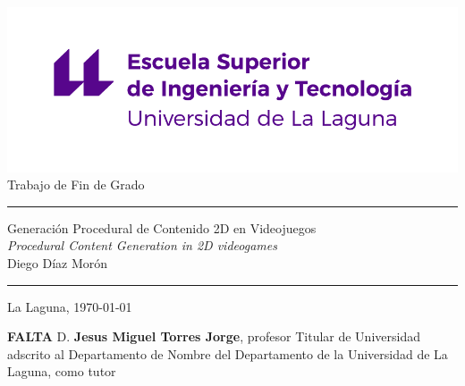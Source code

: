 \documentclass[spanish,a4paper,12pt,oneside]{extreport}
\begin{document}
\renewcommand\listtablename{Índice de Tablas}    
\renewcommand\listfigurename{Índice de Figuras}    

\pagestyle{empty}
\thispagestyle{empty}


\newcommand{\HRule}{\rule{\linewidth}{1mm}}
\setlength{\parindent}{0mm}
\setlength{\parskip}{0mm}


\begin{center}
\includegraphics[scale=0.8]{images/escuela-ingenieria-tecnologia-original}\\[10mm]
{\Huge Trabajo de Fin de Grado}
\end{center}

\HRule
\begin{flushright}
        {\Huge Generación Procedural de Contenido 2D en Videojuegos} \\[2.5mm]
        {\Large \textit{Procedural Content Generation in 2D videogames}} \\[5mm]
        {\Large Diego Díaz Morón} \\[5mm]


\end{flushright}
\HRule
{}
\begin{center}
  \Large La Laguna, \today
\end{center}

\setlength{\parindent}{5mm}

\newpage
\thispagestyle{empty}

{\bf FALTA}
D. {\bf Jesus Miguel Torres Jorge}, profesor Titular de Universidad adscrito al Departamento de Nombre del Departamento de la Universidad de La Laguna, como tutor
\end{document}
